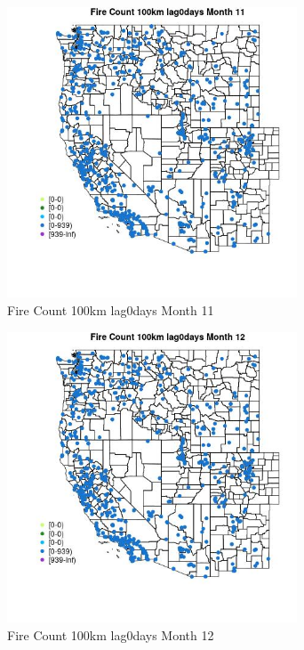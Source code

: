 \begin{figure} 
\centering  
\includegraphics[width=0.77\textwidth]{Code_Outputs/Report_ML_input_PM25_Step4_part_e_de_duplicated_aves_compiled_2019-05-21wNAs_MapObsMo11Fire_Count_100km_lag0days.jpg} 
\caption{\label{fig:Report_ML_input_PM25_Step4_part_e_de_duplicated_aves_compiled_2019-05-21wNAsMapObsMo11Fire_Count_100km_lag0days}Fire Count 100km lag0days Month 11} 
\end{figure} 
 

\begin{figure} 
\centering  
\includegraphics[width=0.77\textwidth]{Code_Outputs/Report_ML_input_PM25_Step4_part_e_de_duplicated_aves_compiled_2019-05-21wNAs_MapObsMo12Fire_Count_100km_lag0days.jpg} 
\caption{\label{fig:Report_ML_input_PM25_Step4_part_e_de_duplicated_aves_compiled_2019-05-21wNAsMapObsMo12Fire_Count_100km_lag0days}Fire Count 100km lag0days Month 12} 
\end{figure} 
 

